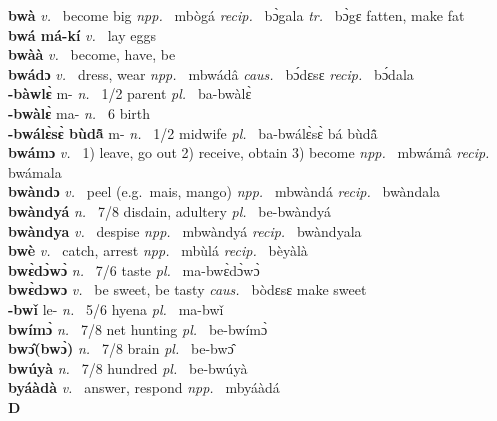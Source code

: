 {\bfseries bwà}  {\itshape v.~} become big   {\itshape npp.~} mbògá {\itshape recip.~} bɔ̀gala {\itshape tr.~} bɔ̀gɛ fatten, make fat \\ 
{\bfseries bwá má-kí}  {\itshape v.~} lay eggs    \\ 
{\bfseries bwàà}  {\itshape v.~} become, have, be    \\ 
{\bfseries bwádɔ}  {\itshape v.~} dress, wear   {\itshape npp.~} mbwádâ {\itshape caus.~} bɔ́dɛsɛ {\itshape recip.~} bɔ́dala  \\ 
{\bfseries -bàwlɛ̀} m- {\itshape n.~} 1/2 parent {\itshape pl.~} ba-bwàlɛ̀   \\ 
{\bfseries -bwàlɛ̀} ma- {\itshape n.~} 6 birth    \\ 
{\bfseries -bwálɛ̀sɛ̀ bùdã̂} m- {\itshape n.~} 1/2 midwife {\itshape pl.~} ba-bwálɛ̀sɛ̀ bá bùdã̂    \\ 
{\bfseries bwámɔ}  {\itshape v.~} 1) leave, go out 2) receive, obtain 3) become   {\itshape npp.~} mbwámâ {\itshape recip.~} bwámala  \\ 
{\bfseries bwàndɔ}  {\itshape v.~} peel (e.g.\ mais, mango)   {\itshape npp.~} mbwàndá {\itshape recip.~} bwàndala  \\ 
{\bfseries bwàndyá}  {\itshape n.~} 7/8 disdain, adultery {\itshape pl.~} be-bwàndyá    \\ 
{\bfseries bwàndya}  {\itshape v.~} despise   {\itshape npp.~} mbwàndyá {\itshape recip.~} bwàndyala  \\ 
{\bfseries bwè}  {\itshape v.~} catch, arrest   {\itshape npp.~} mbùlá {\itshape recip.~} bèyàlà  \\ 
{\bfseries bwɛ̀dɔ̀wɔ̀}  {\itshape n.~} 7/6 taste {\itshape pl.~} ma-bwɛ̀dɔ̀wɔ̀    \\ 
{\bfseries bwɛ̀dɔwɔ}  {\itshape v.~} be sweet, be tasty   {\itshape caus.~} bòdɛsɛ make sweet  \\ 
{\bfseries -bwǐ} le- {\itshape n.~} 5/6 hyena {\itshape pl.~} ma-bwǐ    \\ 
{\bfseries bwímɔ̀}  {\itshape n.~} 7/8 net hunting {\itshape pl.~} be-bwímɔ̀    \\ 
{\bfseries bwɔ̂(bwɔ̀)}  {\itshape n.~} 7/8 brain {\itshape pl.~} be-bwɔ̂    \\ 
{\bfseries bwúyà}  {\itshape n.~} 7/8 hundred {\itshape pl.~} be-bwúyà    \\ 
{\bfseries byáàdà}  {\itshape v.~} answer, respond   {\itshape npp.~} mbyáàdá  \\ 

\medskip
\noindent \large {\bfseries D}\normalsize\\
\medskip

